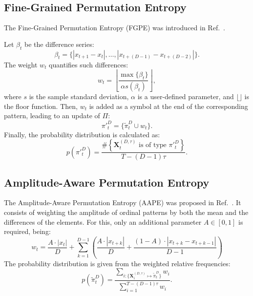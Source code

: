 \documentclass[journal]{IEEEtran}
\begin{document}
\subsection{Fine-Grained Permutation Entropy}\label{FGPE}

The Fine-Grained Permutation Entropy (FGPE) was introduced in Ref.~\cite{xiao2009fine}.

Let $\beta_t$ be the difference series:
\begin{equation}
\beta_t = \big\{|x_{t+1} - x_t|, \dots, |x_{t+(D-1)} - x_{t+(D-2)}|\big\}.
\end{equation}
The weight $w_t$ quantifies such differences:
\begin{equation}
w_t = \left \lfloor \frac{\max\{\beta_t\}}{\alpha s(\beta_t) } \right \rfloor,
\end{equation}
where $s$ is the sample standard deviation,
$\alpha$ is a user-defined parameter, 
and $\lfloor \rfloor$ is the floor function.
Then, $w_t$ is added as a symbol at the end of the corresponding pattern, leading to an update of $\Pi$:
\begin{equation}
\pi{'}_t^D = \{ \widetilde \pi_t^D \cup w_t\}.
\end{equation} 
Finally, the probability distribution is calculated as:
\begin{equation}
p(\pi{'}_t^D) = \frac{\#\left \{\mathbf{X}_t^{(D,\tau)} \text{ is of type } \pi{'}_t^D\right \}}{T- (D-1)\tau}.
\end{equation}

\subsection{Amplitude-Aware Permutation Entropy}\label{AAPE}

The Amplitude-Aware Permutation Entropy (AAPE) was proposed in Ref.~\cite{azami2016amplitude}.
It consists of weighting the amplitude of ordinal patterns by both the mean and the differences of the elements.
For this, only an additional parameter $ A \in [0, 1]$ is required, being:
\begin{equation}
w_t = \frac{A \cdot |x_t|}{D} + \sum_{k = 1}^{D - 1} \left(\frac{A \cdot |x_{t + k}|}{D} + \frac{(1 - A) \cdot |x_{t+k} - x_{t+k-1}|}{D - 1}\right)
\end{equation}
The probability distribution is given from the weighted relative frequencies:
\begin{equation}
p(\widetilde \pi_t^D) = \frac{\sum_{i : \{\mathbf{X}^{(D,\tau)}_i \mapsto \widetilde\pi^D_t\}} w_{i}}{\sum_{i = 1}^{T-(D-1)\tau} w_{i}}.
\end{equation}
\end{document}
